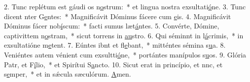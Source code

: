 2. Tunc replétum est gáudi os n\uline{o}strum:~* et lingua nostra exsultati\uline{ó}ne.
3. Tunc dicent nter G\uline{e}ntes:~* Magnificávit Dóminus fácere cum \uline{e}is.
4. Magnificávit Dóminus fácer nob\uline{í}scum:~* facti sumus læt\uline{á}ntes.
5. Convérte, Dómine, captivittem n\uline{o}stram,~* sicut torrens in \uline{au}stro.
6. Qui séminnt in l\uline{á}crimis,~* in exsultatióne m\uline{e}tent.
7. Eúntes ibnt et fl\uline{e}bant,~* mitténtes sémina s\uline{u}a.
8. Veniéntes autem vénient cum exsultti\uline{ó}ne,~* portántes manípulos s\uline{u}os.
9. Glória Patr, et F\uline{í}lio,~* et Spirítui S\uline{a}ncto.
10. Sicut erat in princípio, et nnc, et s\uline{e}mper,~* et in sǽcula sæculórum. \uline{A}men.
